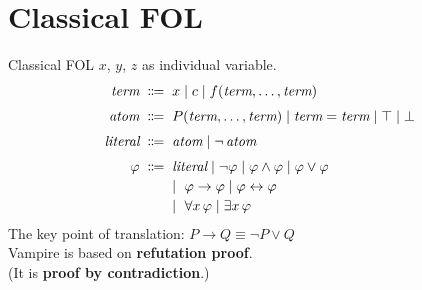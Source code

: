 \documentclass[aspectratio=43]{beamer}
\begin{document}
\section{Classical FOL}
\begin{frame}{Classical FOL}
    $x$, $y$, $z$ as individual variable.
    \medskip
    \[
    \begin{array}{r@{\;\;}c@{\;\;}l}
        \textit{term}    & \Coloneqq & x \mid c \mid f(\textit{term}, \dots, \textit{term}) \\[6pt]
        \textit{atom}    & \Coloneqq & P(\textit{term}, \dots, \textit{term})
                                       \mid \textit{term} = \textit{term}
                                       \mid \top
                                       \mid \bot \\[6pt]
        \textit{literal} & \Coloneqq & \textit{atom} \mid \neg\, \textit{atom} \\[6pt]
        \varphi          & \Coloneqq & \textit{literal} \mid \neg\varphi \mid \varphi \land \varphi \mid \varphi \lor \varphi \\[2pt]
                         &           & \mid\ \varphi \to \varphi \mid \varphi \leftrightarrow \varphi \\[2pt]
                         &           & \mid\ \forall x\, \varphi \mid \exists x\, \varphi
    \end{array}
    \]
    The key point of translation: $P \rightarrow Q \equiv \neg P \lor Q$ \\
    Vampire is based on \textbf{refutation proof}. \\
    (It is \textbf{proof by contradiction}.) \\
    \vfill
\end{frame}
\end{document}
